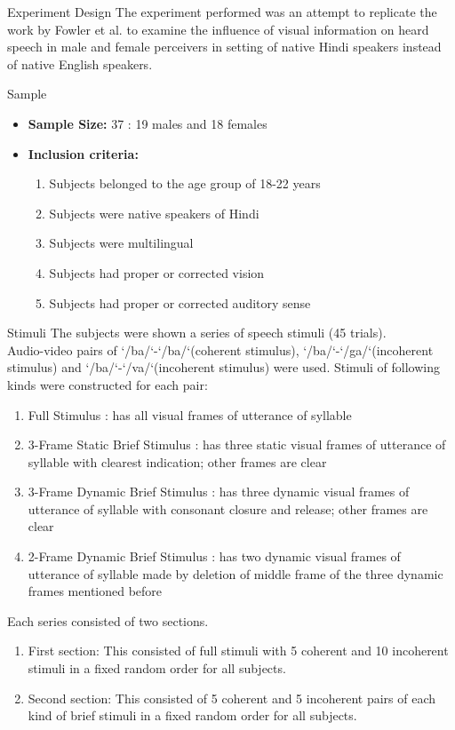 \documentclass{article}
\begin{document}
\begin{psection}{Experiment Design}
	The experiment performed was an attempt to replicate the work by Fowler et al. \cite{sex difference}  to examine the influence of visual information on heard speech in male and female perceivers  in setting of native Hindi speakers instead of native English speakers.
	\begin{psubsection}{Sample}
		\begin{itemize}
			\item \textbf{Sample Size:} 37 : 19 males and 18 females
			\item \textbf{Inclusion criteria:} 
				\begin{enumerate}
					\item Subjects belonged to the age group of 18-22 years
					\item Subjects were native speakers of Hindi
					\item Subjects were multilingual
					\item Subjects had proper or corrected vision
					\item Subjects had proper or corrected auditory sense
				\end{enumerate}
		\end{itemize}
	\end{psubsection}
	\begin{psubsection}{Stimuli}
		The subjects were shown a series of speech stimuli (45 trials).\\
		Audio-video pairs of `/ba/`-`/ba/`(coherent stimulus), `/ba/`-`/ga/`(incoherent stimulus) and `/ba/`-`/va/`(incoherent stimulus) were used. Stimuli of following kinds were constructed for each pair:
		\begin{enumerate}
			\item Full Stimulus : has all visual frames of utterance of syllable
			\item 3-Frame Static Brief Stimulus : has three static visual frames of utterance of syllable with clearest indication; other frames are clear
			\item 3-Frame Dynamic Brief Stimulus : has three dynamic visual frames of utterance of syllable with consonant closure and release; other frames are clear
			\item 2-Frame Dynamic Brief Stimulus : has two dynamic visual frames of utterance of syllable made by deletion of middle frame of the three dynamic frames mentioned before
		\end{enumerate}
		Each series consisted of two sections.
		\begin{enumerate}
			\item First section: This consisted of full stimuli with 5 coherent and 10 incoherent stimuli in a fixed random order for all subjects.
			\item Second section: This consisted of 5 coherent and 5 incoherent pairs of each kind of brief stimuli in a fixed random order for all subjects. 
		\end{enumerate}
	\end{psubsection}


\end{psection}
\end{document}
